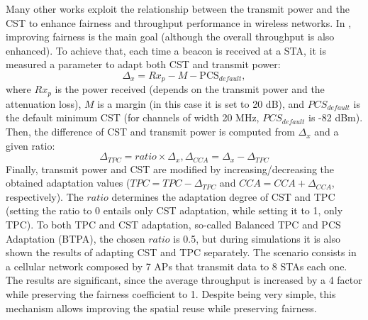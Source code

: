 \documentclass[12pt, a4paper,twoside]{tesi_upf}
\begin{document}
			Many other works exploit the relationship between the transmit power and the CST to enhance fairness and throughput performance in wireless networks. In \cite{jamil2015preserving}, improving fairness is the main goal (although the overall throughput is also enhanced). To achieve that, each time a beacon is received at a STA, it is measured a parameter to adapt both CST and transmit power: 
			\begin{equation}
				\nonumber
				\Delta_x = Rx_p - M - \text{PCS}_{default}, 
			\end{equation}
			where $Rx_p$ is the power received (depends on the transmit power and the attenuation loss), $M$ is a margin (in this case it is set to 20 dB), and $PCS_{default}$ is the default minimum CST (for channels of width 20 MHz, $PCS_{default}$ is -82 dBm). Then, the difference of CST and transmit power is computed from $\Delta_x$ and a given ratio:
			\begin{equation}
				\Delta_{TPC} = ratio \times \Delta_x, \Delta_{CCA} = \Delta_x - \Delta_{TPC}
				\nonumber
			\end{equation}
			Finally, transmit power and CST are modified by increasing/decreasing the obtained adaptation values ($TPC = TPC - \Delta_{TPC}$ and $CCA = CCA + \Delta_{CCA}$, respectively). The $ratio$ determines the adaptation degree of CST and TPC (setting the ratio to 0 entails only CST adaptation, while setting it to 1, only TPC). To both TPC and CST adaptation, so-called Balanced TPC and PCS Adaptation (BTPA), the chosen $ratio$ is 0.5, but during simulations it is also shown the results of adapting CST and TPC separately. The scenario consists in a cellular network composed by 7 APs that transmit data to 8 STAs each one. The results are significant, since the average throughput is increased by a 4 factor while preserving the fairness coefficient to 1. Despite being very simple, this mechanism allows improving the spatial reuse while preserving fairness. 
			
\end{document}
